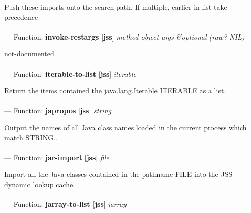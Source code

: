\begin{adjustwidth}{5em}{5em}
Push these imports onto the search path. If multiple, earlier in list take precedence
\end{adjustwidth}

\paragraph{}
\label{JSS:INVOKE-RESTARGS}
--- Function: \textbf{invoke-restargs} [\textbf{jss}] \textit{method object args \&optional (raw? NIL)}

\begin{adjustwidth}{5em}{5em}
not-documented
\end{adjustwidth}

\paragraph{}
\label{JSS:ITERABLE-TO-LIST}
--- Function: \textbf{iterable-to-list} [\textbf{jss}] \textit{iterable}

\begin{adjustwidth}{5em}{5em}
Return the items contained the java.lang.Iterable ITERABLE as a list.
\end{adjustwidth}

\paragraph{}
\label{JSS:JAPROPOS}
--- Function: \textbf{japropos} [\textbf{jss}] \textit{string}

\begin{adjustwidth}{5em}{5em}
Output the names of all Java class names loaded in the current process which match STRING..
\end{adjustwidth}

\paragraph{}
\label{JSS:JAR-IMPORT}
--- Function: \textbf{jar-import} [\textbf{jss}] \textit{file}

\begin{adjustwidth}{5em}{5em}
Import all the Java classes contained in the pathname FILE into the JSS dynamic lookup cache.
\end{adjustwidth}

\paragraph{}
\label{JSS:JARRAY-TO-LIST}
--- Function: \textbf{jarray-to-list} [\textbf{jss}] \textit{jarray}

